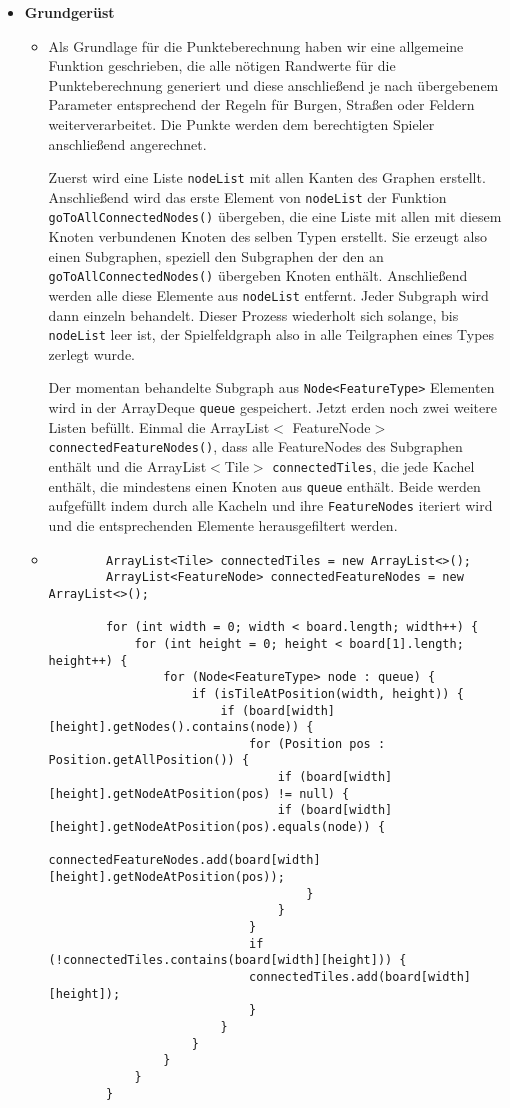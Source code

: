 \begin{itemize}

\item \textbf{Grundgerüst}
	\begin{itemize}
	\item[]
	Als Grundlage für die Punkteberechnung haben wir eine allgemeine Funktion geschrieben, die alle nötigen Randwerte für die Punkteberechnung generiert und diese anschließend je nach übergebenem Parameter entsprechend der Regeln für Burgen, 	Straßen oder Feldern weiterverarbeitet. Die Punkte werden dem berechtigten Spieler anschließend angerechnet.
	
	
	Zuerst wird eine Liste \texttt {nodeList} mit allen Kanten des Graphen erstellt. Anschließend wird das erste Element von \texttt {nodeList} der Funktion \texttt {goToAllConnectedNodes()} übergeben, die eine Liste mit allen mit diesem 		
	Knoten verbundenen Knoten des selben Typen erstellt. Sie erzeugt also einen Subgraphen, speziell den Subgraphen der den an \texttt {goToAllConnectedNodes()} übergeben Knoten enthält. Anschließend werden alle diese Elemente aus \texttt 	
	{nodeList} entfernt. Jeder Subgraph wird dann einzeln behandelt. Dieser Prozess wiederholt sich solange, bis 
	\texttt {nodeList} leer ist, der Spielfeldgraph also in alle Teilgraphen eines Types zerlegt wurde.

	Der momentan behandelte Subgraph aus  \texttt{Node<FeatureType>} Elementen wird in der ArrayDeque \texttt{queue} gespeichert. Jetzt erden noch zwei weitere Listen befüllt.
	Einmal die ArrayList$<$ FeatureNode$>$ 	\\
	\texttt{connectedFeatureNodes()}, dass alle FeatureNodes des Subgraphen enthält und die ArrayList$<$Tile$>$  
	\texttt{connectedTiles}, die jede Kachel enthält, 
	die mindestens einen Knoten aus \texttt{queue} enthält. Beide werden aufgefüllt 	indem durch alle Kacheln und ihre \texttt{FeatureNodes} iteriert wird und die entsprechenden Elemente herausgefiltert werden.
	
	\item[]
		\begin{lstlisting}
		ArrayList<Tile> connectedTiles = new ArrayList<>();   
		ArrayList<FeatureNode> connectedFeatureNodes = new ArrayList<>(); 
				
		for (int width = 0; width < board.length; width++) {
			for (int height = 0; height < board[1].length; height++) {
				for (Node<FeatureType> node : queue) {
					if (isTileAtPosition(width, height)) {
						if (board[width][height].getNodes().contains(node)) {
							for (Position pos : Position.getAllPosition()) { 
								if (board[width][height].getNodeAtPosition(pos) != null) {
								if (board[width][height].getNodeAtPosition(pos).equals(node)) {
									connectedFeatureNodes.add(board[width][height].getNodeAtPosition(pos));
									}
								}
							}
							if (!connectedTiles.contains(board[width][height])) {
							connectedTiles.add(board[width][height]);
							}
						}
					}
				}
			}
		}
	\end{lstlisting}
	\end{itemize}
	

\end{itemize}
